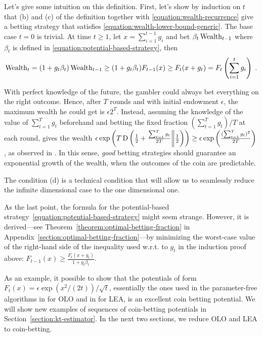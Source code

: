 Let's give some intuition on this definition.  First, let's show by induction
on $t$ that (b) and (c) of the definition together with
\eqref{equation:wealth-recurrence} give a betting strategy that satisfies
\eqref{equation:wealth-lower-bound-generic}. The base case $t=0$ is trivial. At
time $t \ge 1$, let $x = \sum_{i=1}^{t-1} g_i$ and bet $\beta_t \operatorname{Wealth}_{t-1}$
where $\beta_t$ is defined in \eqref{equation:potential-based-strategy}, then
\vspace{-.2cm}
\[
\operatorname{Wealth}_t
= (1+g_t \beta_t) \operatorname{Wealth}_{t-1}
\ge (1 + g_t \beta_t) F_{t-1}(x)
\ge F_t(x + g_t)
= F_t \left( \sum_{i=1}^t g_i \right) \; .
\]

With perfect knowledge of the future, the gambler could always bet everything
on the right outcome. Hence, after $T$ rounds and with initial endowment
$\epsilon$, the maximum wealth he could get is $\epsilon 2^T$.  Instead,
assuming the knowledge of the value of $\sum_{t=1}^T g_t$ beforehand and betting the
fixed fraction $(\sum_{t=1}^T g_t)/T$ at each round, gives the wealth $\epsilon
\exp\left(T \operatorname{D}\left({\tfrac{1}{2}+\tfrac{\sum_{t=1}^T g_t}{2
T}}\middle\|{\tfrac{1}{2}}\right)\right) \geq \epsilon \exp\left(\tfrac{(\sum_{t=1}^T g_t)^2}{2
T}\right)$, as observed in \cite{McMahan-Abernethy-2013}.  In this sense,
\emph{good} betting strategies should guarantee an exponential growth of the
wealth, when the outcomes of the coin are predictable.

The condition (d) is a technical condition that will allow us to
seamlessly reduce the infinite dimensional case to the one dimensional one.

As the last point, the formula for the potential-based
strategy~\eqref{equation:potential-based-strategy} might seem strange. However,
it is derived---see Theorem~\ref{theorem:optimal-betting-fraction} in
Appendix~\ref{section:optimal-betting-fraction}---by minimizing the worst-case
value of the right-hand side of the inequality used w.r.t. to $g_t$ in the
induction proof above: $F_{t-1}(x) \ge \tfrac{F_{t}(x + g_t)}{1+g_t\beta_t}$.

As an example, it possible to show that the potentials of form $F_t(x)=\epsilon
\exp \left(x^2/(2t)\right)/\sqrt{t}$, essentially the ones used in the
parameter-free algorithms in \cite{McMahan-Orabona-2014, Orabona-2014} for
\ac{OLO} and in \cite{Chaudhuri-Freund-Hsu-2009, Luo-Schapire-2014,
Luo-Schapire-2015} for \ac{LEA}, is an excellent coin betting potential.  We
will show new examples of sequences of coin-betting potentials in
Section~\ref{section:kt-estimator}.  In the next two sections, we reduce
\ac{OLO} and \ac{LEA} to coin-betting.
